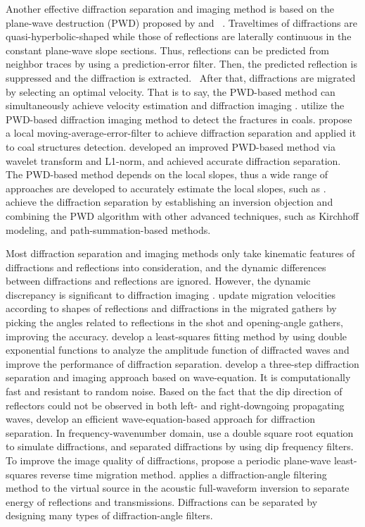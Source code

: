 Another effective diffraction separation and imaging method is based on the plane-wave destruction (PWD) proposed by \cite[]{Sergey2002Applications} and  \cite[]{2007Post}. Traveltimes of diffractions are quasi-hyperbolic-shaped while those of reflections are laterally continuous in the constant plane-wave slope sections. Thus, reflections can be predicted from neighbor traces by using a prediction-error filter. Then, the predicted reflection is suppressed and the diffraction is extracted.  After that, diffractions are migrated by selecting an optimal velocity. That is to say, the PWD-based method can simultaneously achieve velocity estimation and diffraction imaging \cite[]{2011Azimuthally}. 
\cite[]{2013Coal} utilize the PWD-based diffraction imaging method to detect the fractures in coals.
\cite[]{Binzhong2018seismic} propose a local moving-average-error-filter to achieve diffraction separation and applied it to coal structures detection. 
\cite[]{2018l1} developed an improved PWD-based method via wavelet transform and L1-norm, and achieved accurate diffraction separation.
The PWD-based method depends on the local slopes, thus a wide range of approaches are developed to accurately estimate the local slopes, such as \cite[]{2008Separation, 2010Nonlinear, 2018Dip}.
\cite[]{2020Least} achieve the diffraction separation by establishing an inversion objection and combining the PWD algorithm with other advanced techniques, such as Kirchhoff modeling, and path-summation-based methods.

Most diffraction separation and imaging methods only take kinematic features of diffractions and reflections into consideration, and the dynamic differences between diffractions and reflections are ignored. However, the dynamic discrepancy is significant to diffraction imaging \cite[]{2015Diffraction, 20193D, 2020Diffraction}.
\cite[]{2014Diffraction} update migration velocities according to shapes of reflections and diffractions in the migrated gathers by picking the angles related to reflections in the shot and opening-angle gathers, improving the accuracy.
\cite[]{2015Diffraction} develop a least-squares fitting method by using double exponential functions to analyze the amplitude function of diffracted waves and improve the performance of diffraction separation.
\cite[]{2016Imaging} develop a three-step diffraction separation and imaging approach based on wave-equation. It is computationally fast and resistant to random noise.
Based on the fact that the dip direction of reflectors could not be observed in both left- and right-downgoing propagating waves, \cite[]{2019Efficient} develop an efficient wave-equation-based approach for diffraction separation.
In frequency-wavenumber domain, \cite[]{2020Inspiration} use a double square root equation to simulate diffractions, and separated diffractions by using dip frequency filters.
To improve the image quality of diffractions, \cite[]{2020Periodic} propose a periodic plane-wave least-squares reverse time migration method.
\cite[]{2021Diffraction} applies a diffraction-angle filtering method to the virtual source in the acoustic full-waveform inversion to separate energy of reflections and transmissions. Diffractions can be separated by designing many types of diffraction-angle filters.

